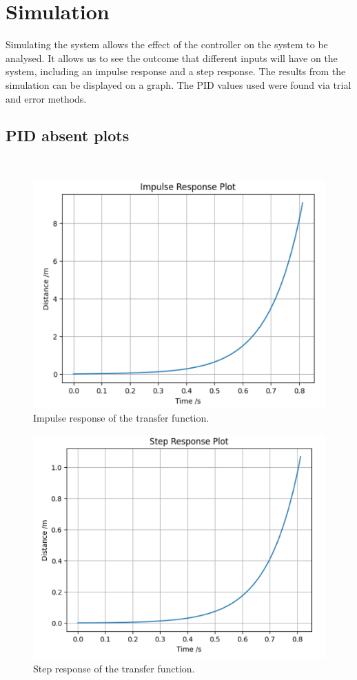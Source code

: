 \section{Simulation}
Simulating the system allows the effect of the controller on the system to be analysed. It allows us to see the
outcome that different inputs will have on the system, including an impulse response and a step response.
The results from the simulation can be displayed on a graph. The PID values used were found via trial and error methods.
\subsection*{PID absent plots} \hfill \\
\begin{figure}[ht]
    \includegraphics[width=0.65\linewidth]{Simulation/Impulse Plot no pid.png}
        \caption{Impulse response of the transfer function.}
\end{figure}

\begin{figure}[ht]
    \includegraphics[width=0.65\linewidth]{Simulation/Step Plot no pid.png}
    \caption{Step response of the transfer function.}
\end{figure}

